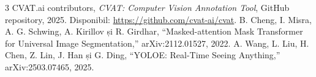\documentclass[10pt,a4paper]{article}
\begin{document}
\begin{thebibliography}{3}
\footnotesize
\setlength{\itemsep}{0pt}
\setlength{\parskip}{0pt}
 CVAT.ai contributors, \textit{CVAT: Computer Vision Annotation Tool}, GitHub repository, 2025. Disponibil: \url{https://github.com/cvat-ai/cvat}.
 B. Cheng, I. Misra, A. G. Schwing, A. Kirillov și R. Girdhar, ``Masked-attention Mask Transformer for Universal Image Segmentation,'' arXiv:2112.01527, 2022.
 A. Wang, L. Liu, H. Chen, Z. Lin, J. Han și G. Ding, ``YOLOE: Real-Time Seeing Anything,'' arXiv:2503.07465, 2025.
\end{thebibliography}
\end{document}
